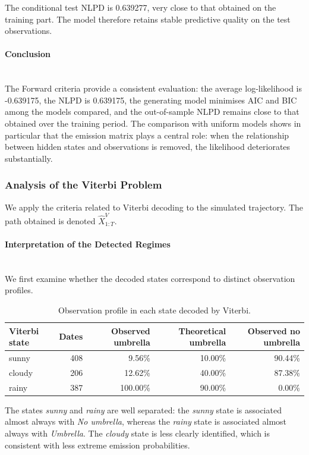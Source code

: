 \documentclass[11pt]{article}
\begin{document}
The conditional test NLPD is 0.639277, very close to that obtained on the
training part. The model therefore retains stable predictive quality on the test observations.

\paragraph{Conclusion}\mbox{}\\
The Forward criteria provide a consistent evaluation: the average log-likelihood is -0.639175, the NLPD is 0.639175, the generating model minimises AIC and BIC among the models compared, and the out-of-sample NLPD remains close to that obtained over the training period.
The comparison with uniform models shows in particular that the emission matrix plays a central role: when the relationship between hidden states and observations is removed, the likelihood deteriorates substantially.

\subsubsection{Analysis of the Viterbi Problem}

We apply the criteria related to Viterbi decoding to the simulated trajectory. The path obtained is
denoted \(\hat X^V_{1:T}\).

\paragraph{Interpretation of the Detected Regimes}\mbox{}\\

We first examine whether the decoded states correspond to distinct observation profiles.

\begin{table}[H]
\centering
\begin{tabular}{lrrrr}
\toprule
Viterbi state & Dates & Observed umbrella & Theoretical umbrella & Observed no umbrella \\
\midrule
sunny & 408 & 9.56\% & 10.00\% & 90.44\% \\
cloudy & 206 & 12.62\% & 40.00\% & 87.38\% \\
rainy & 387 & 100.00\% & 90.00\% & 0.00\% \\
\bottomrule
\end{tabular}
\caption{Observation profile in each state decoded by Viterbi.}
\end{table}

The states \emph{sunny} and \emph{rainy} are well separated: the \emph{sunny} state is associated almost
always with \emph{No umbrella}, whereas the \emph{rainy} state is associated almost always with
\emph{Umbrella}. The \emph{cloudy} state is less clearly identified, which is consistent with
less extreme emission probabilities.
\end{document}
